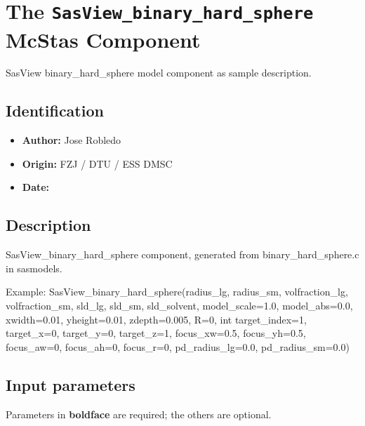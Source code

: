 \section{The \texttt{SasView\_binary\_hard\_sphere} McStas Component}
SasView binary\_hard\_sphere model component as sample description.

\subsection*{Identification}
\begin{itemize}
  \item \textbf{Author:} Jose Robledo
  \item \textbf{Origin:} FZJ / DTU / ESS DMSC
  \item \textbf{Date:} 
\end{itemize}

\subsection*{Description}
SasView\_binary\_hard\_sphere component, generated from binary\_hard\_sphere.c in sasmodels.

Example: SasView\_binary\_hard\_sphere(radius\_lg, radius\_sm, volfraction\_lg, volfraction\_sm, sld\_lg, sld\_sm, sld\_solvent, model\_scale=1.0, model\_abs=0.0, xwidth=0.01, yheight=0.01, zdepth=0.005, R=0, int target\_index=1, target\_x=0, target\_y=0, target\_z=1, focus\_xw=0.5, focus\_yh=0.5, focus\_aw=0, focus\_ah=0, focus\_r=0, pd\_radius\_lg=0.0, pd\_radius\_sm=0.0)

\subsection*{Input parameters}
Parameters in \textbf{boldface} are required; the others are optional.

